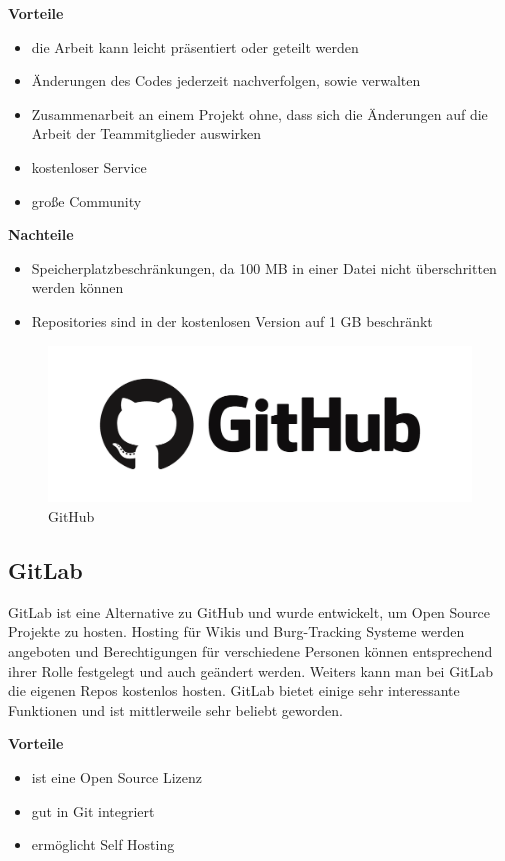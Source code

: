 \textbf{Vorteile}
\begin{itemize}
	\item die Arbeit kann leicht präsentiert oder geteilt werden
	\item Änderungen des Codes jederzeit nachverfolgen, sowie verwalten
	\item Zusammenarbeit an einem Projekt ohne, dass sich die Änderungen auf die Arbeit der Teammitglieder auswirken
	\item kostenloser Service
	\item große Community
\end{itemize}

\textbf{Nachteile}
\begin{itemize}
	\item Speicherplatzbeschränkungen, da 100 MB in einer Datei nicht überschritten werden können
	\item Repositories sind in der kostenlosen Version auf 1 GB beschränkt
\end{itemize}


\begin{figure}[H]
	\centering
	\includegraphics[width=0.5\linewidth]{images/GitHub.png}
	\caption[GitHub]{GitHub}
	\label{fig:GitHub}
\end{figure}

\newpage
\subsection{GitLab}
GitLab ist eine Alternative zu GitHub und wurde entwickelt, um Open Source Projekte zu hosten. Hosting für Wikis und Burg-Tracking Systeme werden angeboten und Berechtigungen für verschiedene Personen können entsprechend ihrer Rolle festgelegt und auch geändert werden. Weiters kann man bei GitLab die eigenen Repos kostenlos hosten. GitLab bietet einige sehr interessante Funktionen und ist mittlerweile sehr beliebt geworden.   \parencite{GitHubVsGitLab}

\textbf{Vorteile}
\begin{itemize}
	\item ist eine Open Source Lizenz
	\item gut in Git integriert
	\item ermöglicht Self Hosting
\end{itemize}

